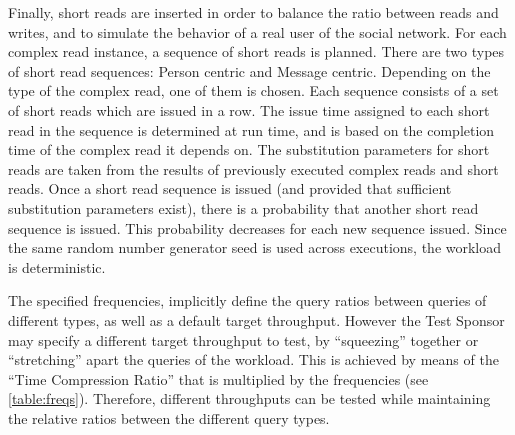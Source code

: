 Finally, short reads are inserted in order to balance the ratio between reads
and writes, and to simulate the behavior of a real user of the social network.
For each complex read instance, a sequence of short reads is planned. There are two
types of short read sequences: Person centric and Message centric. Depending on
the type of the complex read, one of them is chosen. Each sequence consists of
a set of short reads which are issued in a row. The issue time assigned to each
short read in the sequence is determined at run time, and is based on the
completion time of the complex read it depends on. 
The substitution parameters for short reads are taken from the results of previously
executed complex reads and short reads.
Once a short read sequence is issued (and provided that sufficient substitution parameters 
exist), there is a probability that another short read  sequence is issued. 
This probability decreases for each new sequence issued. 
Since the same random number generator seed is used across
executions, the workload is deterministic.


The specified frequencies, implicitly define the query ratios between queries
of different types, as well as a default target throughput. However the Test
Sponsor may specify a different target throughput to test,  by ``squeezing''
together or ``stretching'' apart the queries of the workload. This is
achieved  by means of the ``Time Compression Ratio'' that is multiplied by the
frequencies (see \autoref{table:freqs}).  Therefore, different
throughputs can be tested while maintaining the relative ratios between the
different query types.